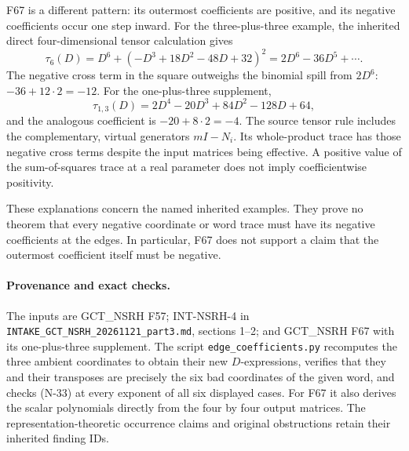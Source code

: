 F67 is a different pattern: its outermost coefficients are positive,
and its negative coefficients occur one step inward.  For the
three-plus-three example, the inherited direct four-dimensional
tensor calculation gives
\[
 \tau_6(D)=D^6+(-D^3+18D^2-48D+32)^2
          =2D^6-36D^5+\cdots.
\]
The negative cross term in the square outweighs the binomial spill
from $2D^6$: $-36+12\cdot2=-12$.  For the one-plus-three supplement,
\[
 \tau_{1,3}(D)=2D^4-20D^3+84D^2-128D+64,
\]
and the analogous coefficient is $-20+8\cdot2=-4$.
The source tensor rule includes the complementary, virtual generators
$mI-N_i$.  Its whole-product trace has those negative cross terms
despite the input matrices being effective.  A positive value of the
sum-of-squares trace at a real parameter does not imply coefficientwise
positivity.

These explanations concern the named inherited examples.  They prove
no theorem that every negative coordinate or word trace must have its
negative coefficients at the edges.  In particular, F67 does not
support a claim that the outermost coefficient itself must be negative.

\paragraph{Provenance and exact checks.}
The inputs are GCT\_NSRH F57; INT-NSRH-4 in
\nolinkurl{INTAKE_GCT_NSRH_20261121_part3.md}, sections 1--2;
and GCT\_NSRH F67 with its one-plus-three supplement.  The script
\nolinkurl{edge_coefficients.py} recomputes the three ambient coordinates
to obtain their new $D$-expressions, verifies that they and their
transposes are precisely the six bad coordinates of the given word,
and checks (N-33) at every exponent of all six displayed cases.
For F67 it also derives the scalar polynomials directly from the four
by four output matrices.  The representation-theoretic occurrence
claims and original obstructions retain their inherited finding IDs.
